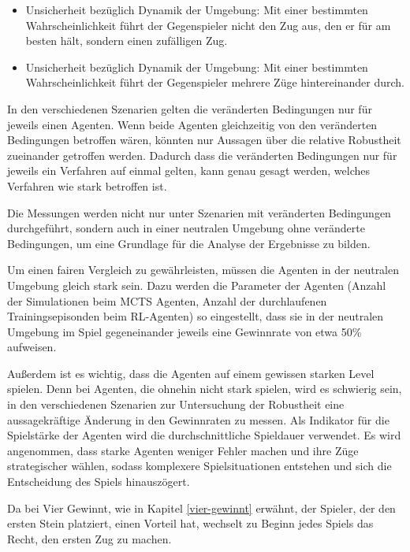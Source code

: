 \begin{itemize}
	\item Unsicherheit bezüglich Dynamik der Umgebung: Mit einer bestimmten Wahrscheinlichkeit führt der Gegenspieler nicht den Zug aus, den er für am besten hält, sondern einen zufälligen Zug.
	
	\item Unsicherheit bezüglich Dynamik der Umgebung: Mit einer bestimmten Wahrscheinlichkeit führt der Gegenspieler mehrere Züge hintereinander durch.
	
\end{itemize}

In den verschiedenen Szenarien gelten die veränderten Bedingungen nur für jeweils einen Agenten. Wenn beide Agenten gleichzeitig von den veränderten Bedingungen betroffen wären, könnten nur Aussagen über die relative Robustheit zueinander getroffen werden. Dadurch dass die veränderten Bedingungen nur für jeweils ein Verfahren auf einmal gelten, kann genau gesagt werden, welches Verfahren wie stark betroffen ist.

Die Messungen werden nicht nur unter Szenarien mit veränderten Bedingungen durchgeführt, sondern auch in einer neutralen Umgebung ohne veränderte Bedingungen, um eine Grundlage für die Analyse der Ergebnisse zu bilden.

Um einen fairen Vergleich zu gewährleisten, müssen die Agenten in der neutralen Umgebung gleich stark sein. Dazu werden die Parameter der Agenten (Anzahl der Simulationen beim MCTS Agenten, Anzahl der durchlaufenen Trainingsepisonden beim RL-Agenten) so eingestellt, dass sie in der neutralen Umgebung im Spiel gegeneinander jeweils eine Gewinnrate von etwa 50\% aufweisen.

Außerdem ist es wichtig, dass die Agenten auf einem gewissen starken Level spielen. Denn bei Agenten, die ohnehin nicht stark spielen, wird es schwierig sein, in den verschiedenen Szenarien zur Untersuchung der Robustheit eine aussagekräftige Änderung in den Gewinnraten zu messen. Als Indikator für die Spielstärke der Agenten wird die durchschnittliche Spieldauer verwendet. Es wird angenommen, dass starke Agenten weniger Fehler machen und ihre Züge strategischer wählen, sodass komplexere Spielsituationen entstehen und sich die Entscheidung des Spiels hinauszögert.

Da bei Vier Gewinnt, wie in Kapitel \ref{vier-gewinnt} erwähnt, der Spieler, der den ersten Stein platziert, einen Vorteil hat, wechselt zu Beginn jedes Spiels das Recht, den ersten Zug zu machen.
